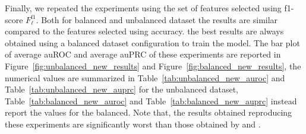 Finally, we repeated the experiments using the set of features selected using f1-score $F_\ell^{\textrm{f1}}$. Both for balanced and unbalanced dataset the results are similar compared to the features selected using accuracy. the best results are always obtained using a balanced dataset configuration to train the model. The bar plot of average auROC and average auPRC of these experiments are reported in Figure~\ref{fig:unbalanced_new_results} and Figure~\ref{fig:balanced_new_results}, the numerical values are summarized in Table~\ref{tab:unbalanced_new_auroc} and Table~\ref{tab:unbalanced_new_auprc} for the unbalanced dataset, Table~\ref{tab:balanced_new_auroc} and Table~\ref{tab:balanced_new_auprc} instead report the values for the balanced.
Note that, the results obtained reproducing these experiments are significantly worst than those obtained by \cite{WassermannDECRES} and \cite{CappelelttiPetriniSingleTask}.  

